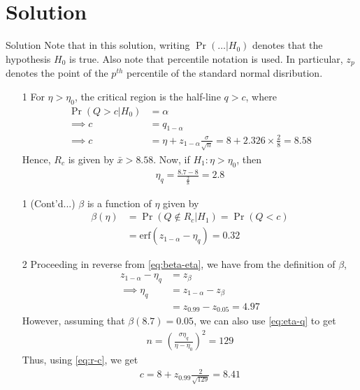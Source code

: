 \documentclass{beamer}
\providecommand{\pr}[1]{\ensuremath{\Pr\left(#1\right)}}
\providecommand{\erf}[1]{\ensuremath{\text{erf}(#1)}}
\begin{document}
\section{Solution}
\begin{frame}{Solution}
	Note that in this solution, writing $\pr{\ldots | H_0}$ denotes that the hypothesis $H_0$ is true. Also note that percentile notation is used. In particular, $z_p$ denotes the point of the $p^{th}$ percentile of the standard normal disribution.
	\begin{enumerate}
		\item[1] For $\eta > \eta_0$, the critical region is the half-line $q > c$, where 
			\begin{align}
				\pr{Q > c | H_0} &= \alpha \\
				\implies c &= q_{1 - \alpha} \\
				\implies c &= \eta + z_{1 - \alpha}\frac{\sigma}{\sqrt{n}} = 8 + 2.326 \times \frac{2}{8} = 8.58
				\label{eq:r-c}
			\end{align}
			Hence, $R_c$ is given by $\bar{x} > 8.58$. Now, if $H_1: \eta > \eta_0$, then
			\begin{align}
				\eta_q = \frac{8.7 - 8}{\frac{2}{8}} = 2.8
				\label{eq:new-eta}
			\end{align}
	\end{enumerate}
\end{frame}

\begin{frame}
	\begin{enumerate}
		\item[1] (Cont'd...) $\beta$ is a function of $\eta$ given by
			\begin{align}
				\beta(\eta) &= \pr{Q \notin R_c | H_1} = \pr{Q < c} \\
				&= \erf{z_{1 - \alpha} - \eta_q} = 0.32
				\label{eq:beta-eta}
			\end{align}
		\item[2] Proceeding in reverse from \eqref{eq:beta-eta}, we have from the definition of $\beta$, 
			\begin{align}
				z_{1 - \alpha} - \eta_q &= z_{\beta} \\
				\implies \eta_q &= z_{1 - \alpha} - z_{\beta} \\
				&= z_{0.99} - z_{0.05} = 4.97
				\label{eq:eta-q-rev}
			\end{align}
			However, assuming that $\beta(8.7) = 0.05$, we can also use \eqref{eq:eta-q} to get 
			\begin{align}
				n = \left(\frac{\sigma\eta_q}{\eta - \eta_0}\right)^2 = 129
				\label{eq:n}
			\end{align}
			Thus, using \eqref{eq:r-c}, we get 
			\begin{align}
				c = 8 + z_{0.99}\frac{2}{\sqrt{129}} = 8.41
				\label{eq:c-ans}
			\end{align}
	\end{enumerate}
\end{frame}
\end{document}
